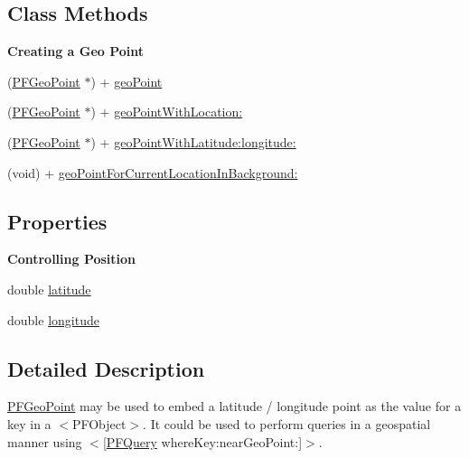 \subsection*{Class Methods}
\begin{Indent}{\bf Creating a Geo Point}\par
{\em 

 

 }\begin{DoxyCompactItemize}
\item 
(\hyperlink{interface_p_f_geo_point}{P\+F\+Geo\+Point} $\ast$) + \hyperlink{interface_p_f_geo_point_af4058b0300a349d82b043994db8fb08b}{geo\+Point}
\item 
(\hyperlink{interface_p_f_geo_point}{P\+F\+Geo\+Point} $\ast$) + \hyperlink{interface_p_f_geo_point_a0561f48bc5b138882ac0551b89258355}{geo\+Point\+With\+Location\+:}
\item 
(\hyperlink{interface_p_f_geo_point}{P\+F\+Geo\+Point} $\ast$) + \hyperlink{interface_p_f_geo_point_afba707c17b34891beeee58470bb3b590}{geo\+Point\+With\+Latitude\+:longitude\+:}
\item 
(void) + \hyperlink{interface_p_f_geo_point_a10cb908531b46341ab0bfeb79a915f1a}{geo\+Point\+For\+Current\+Location\+In\+Background\+:}
\end{DoxyCompactItemize}
\end{Indent}
\subsection*{Properties}
\begin{Indent}{\bf Controlling Position}\par
{\em 

 

 }\begin{DoxyCompactItemize}
\item 
double \hyperlink{interface_p_f_geo_point_a22e8251519dbea12e2fd195b6726e025}{latitude}
\item 
double \hyperlink{interface_p_f_geo_point_ae18b7781d731f421f3feeafd9c99be8b}{longitude}
\end{DoxyCompactItemize}
\end{Indent}


\subsection{Detailed Description}
{\ttfamily \hyperlink{interface_p_f_geo_point}{P\+F\+Geo\+Point}} may be used to embed a latitude / longitude point as the value for a key in a $<$\+P\+F\+Object$>$. It could be used to perform queries in a geospatial manner using $<$\mbox{[}\hyperlink{interface_p_f_query}{P\+F\+Query} where\+Key\+:near\+Geo\+Point\+:\mbox{]}$>$.

